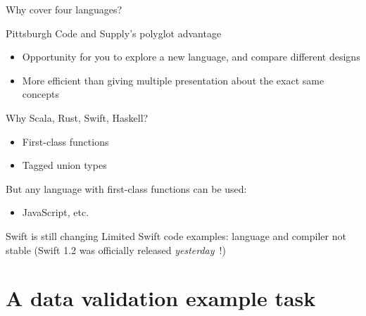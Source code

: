 \begin{frame}{Why cover four languages?}
  \begin{block}{Pittsburgh Code and Supply's polyglot advantage}
    \begin{itemize}
    \item Opportunity for you to explore a new language, and compare
      different designs
    \item More efficient than giving multiple presentation about the
      exact same concepts
    \end{itemize}
  \end{block}

  \begin{block}{Why Scala, Rust, Swift, Haskell?}
    \begin{itemize}
    \item First-class functions
    \item Tagged union types
    \end{itemize}
  \end{block}

  But any language with first-class functions can be used:
  \begin{itemize}
  \item JavaScript, etc.
  \end{itemize}

  \begin{alertblock}{Swift is still changing}
    Limited Swift code examples: language and compiler
    not stable (Swift 1.2 was officially released \emph{yesterday}\ !)
  \end{alertblock}
\end{frame}


\section{A data validation example task}

